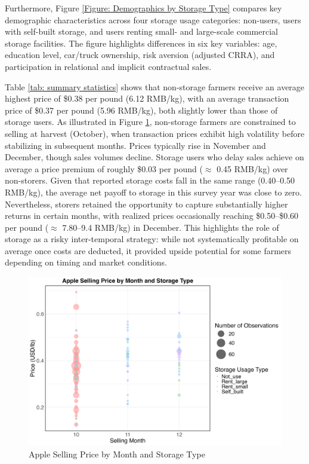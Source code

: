 Furthermore, Figure \ref{Figure: Demographics by Storage Type} compares key demographic characteristics across four storage usage categories: non-users, users with self-built storage, and users renting small- and large-scale commercial storage facilities. The figure highlights differences in six key variables: age, education level, car/truck ownership, risk aversion (adjusted CRRA), and participation in relational and implicit contractual sales.   

Table \ref{tab: summary statistics} shows that non-storage farmers receive an average highest price of \$0.38 per pound (6.12 RMB/kg), with an average transaction price of \$0.37 per pound (5.96 RMB/kg), both slightly lower than those of storage users. As illustrated in Figure \ref{Figure: selling price bubble}, non-storage farmers are constrained to selling at harvest (October), when transaction prices exhibit high volatility before stabilizing in subsequent months. Prices typically rise in November and December, though sales volumes decline. Storage users who delay sales achieve on average a price premium of roughly \$0.03 per pound ($\approx$ 0.45 RMB/kg) over non-storers. Given that reported storage costs fall in the same range (0.40–0.50 RMB/kg), the average net payoff to storage in this survey year was close to zero. Nevertheless, storers retained the opportunity to capture substantially higher returns in certain months, with realized prices occasionally reaching \$0.50--\$0.60 per pound ($\approx$ 7.80--9.4 RMB/kg) in December. This highlights the role of storage as a risky inter-temporal strategy: while not systematically profitable on average once costs are deducted, it provided upside potential for some farmers depending on timing and market conditions.


\begin{figure}[H]
\centering
\includegraphics[width=1.05\textwidth]{figures/apple_price_bubble_plot.png}
\caption{Apple Selling Price by Month and Storage Type}
\label{Figure: selling price bubble}
\end{figure}

